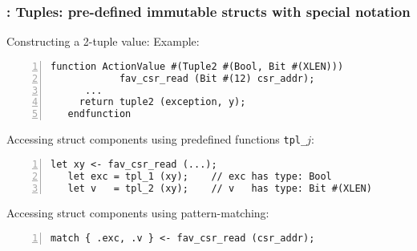 \begin{frame}[fragile]
\frametitle{{\BSV}: Tuples: pre-defined immutable structs with special notation}

\footnotesize

Constructing a 2-tuple value: Example:
\begin{Verbatim}[frame=single, numbers=left, label=from src\_Common/CSRs.bsv]
   function ActionValue #(Tuple2 #(Bool, Bit #(XLEN)))
            fav_csr_read (Bit #(12) csr_addr);
      ...
	 return tuple2 (exception, y);
   endfunction
\end{Verbatim}

\PAUSE{\vspace{2ex}}

Accessing struct components using predefined functions {\tt tpl\_$j$}:
\begin{Verbatim}[frame=single, numbers=left]
   let xy <- fav_csr_read (...);
   let exc = tpl_1 (xy);    // exc has type: Bool
   let v   = tpl_2 (xy);    // v   has type: Bit #(XLEN)
\end{Verbatim}

\PAUSE{\vspace{2ex}}

Accessing struct components using pattern-matching:
\begin{Verbatim}[frame=single, numbers=left]
   match { .exc, .v } <- fav_csr_read (csr_addr);
\end{Verbatim}

\end{frame}


